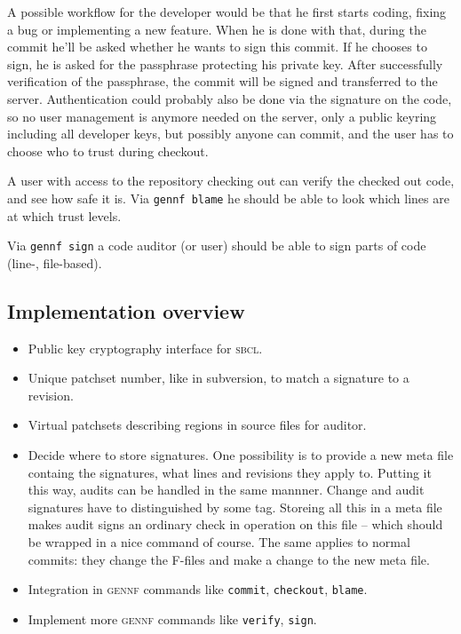 \documentclass[fleqn, 10pt, a4paper]{report} \usepackage{amssymb}
\begin{document}
A possible workflow for the developer would be that he first starts
coding, fixing a bug or implementing a new feature. When he is done
with that, during the commit he'll be asked whether he wants to sign
this commit.  If he chooses to sign, he is asked for the passphrase
protecting his private key. After successfully verification of the
passphrase, the commit will be signed and transferred to the server.
Authentication could probably also be done via the signature on the
code, so no user management is anymore needed on the server, only a
public keyring including all developer keys, but possibly anyone can
commit, and the user has to choose who to trust during checkout.

A user with access to the repository checking out can verify the
checked out code, and see how safe it is.  Via \texttt{gennf blame}
he should be able to look which lines are at which trust levels.

Via \texttt{gennf sign} a code auditor (or user) should be able to
sign parts of code (line-, file-based).

\subsection{Implementation overview}

\begin{itemize}
\item Public key cryptography interface for \textsc{sbcl}.
\item Unique patchset number, like in subversion, to match a signature
  to a revision.
\item Virtual patchsets describing regions in source files for
  auditor.
\item Decide where to store signatures.  One possibility is to provide a
  new meta file containg the signatures, what lines and revisions they
  apply to. Putting it this way, audits can be handled in the same
  mannner. Change and audit signatures have to distinguished by some
  tag. Storeing all this in a meta file makes audit signs an ordinary
  check in operation on this file -- which should be wrapped in a nice
  command of course. The same applies to normal commits: they change
  the F-files and make a change to the new meta file.
\item Integration in \textsc{gennf} commands like \texttt{commit},
  \texttt{checkout}, \texttt{blame}.
\item Implement more \textsc{gennf} commands like \texttt{verify},
  \texttt{sign}.
\end{itemize}
\end{document}
